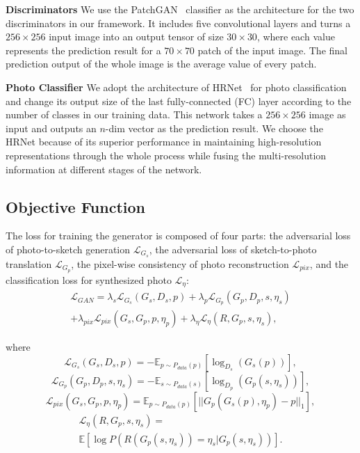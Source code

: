 \documentclass[10pt,twocolumn,letterpaper]{article}
\begin{document}
\noindent \textbf{Discriminators} We use the PatchGAN~\cite{li2016precomputed,ledig2017photo} classifier as the architecture for the two discriminators in our framework. It includes five convolutional layers and turns a $256\times 256$ input image into an output tensor of size $30\times 30$, where each value represents the prediction result for a $70\times 70$ patch of the input image. The final prediction output of the whole image is the average value of every patch.

\noindent \textbf{Photo Classifier} We adopt the architecture of HRNet~\cite{wang2020deep} for photo classification and change its output size of the last fully-connected (FC) layer according to the number of classes in our training data. This network takes a $256\times 256$ image as input and outputs an $n$-dim vector as the prediction result. We choose the HRNet because of its superior performance in maintaining high-resolution representations through the whole process while fusing the multi-resolution information at different stages of the network.

\subsection{Objective Function} 
\label{sec:obj}
The loss for training the generator is composed of four parts: the adversarial loss of photo-to-sketch generation $\mathcal{L}_{G_s}$, the adversarial loss of sketch-to-photo translation $\mathcal{L}_{G_p}$, the pixel-wise consistency of photo reconstruction $\mathcal{L}_{pix}$, and the classification loss for synthesized photo $\mathcal{L}_{\eta}$:
\begin{multline}
\label{eq:l_gan}
    \mathcal{L}_{GAN} = \lambda_s\mathcal{L}_{G_s}(G_s, D_s, p) + \lambda_p\mathcal{L}_{G_p}(G_p,D_p,s,\eta_s) \\ + \lambda_{pix}\mathcal{L}_{pix}(G_s,G_p,p,\eta_p) + \lambda_{\eta}\mathcal{L}_{\eta}(R,G_p,s,\eta_s),
\end{multline}

\noindent where 
\begin{equation}
    \mathcal{L}_{G_s}(G_s, D_s,p) = -\mathbb{E}_{p\sim P_{data}(p)}[\log_{D_s}(G_s(p))],
\end{equation}
\begin{equation}
    \mathcal{L}_{G_p}(G_p, D_p,s,\eta_s) = -\mathbb{E}_{s\sim P_{data}(s)}[\log_{D_p}(G_p(s, \eta_s))],
\end{equation}
\begin{equation}
    \mathcal{L}_{pix}(G_s, G_p, p, \eta_p) = \mathbb{E}_{p\sim P_{data}(p)}[||G_p(G_s(p),\eta_p)-p||_1],
\end{equation}
\begin{multline}
    \mathcal{L}_{\eta}(R,G_p,s,\eta_s) = \\ \mathbb{E}[\log P(R(G_p(s,\eta_s))=\eta_s |G_p(s,\eta_s))].
\end{multline}
\end{document}
